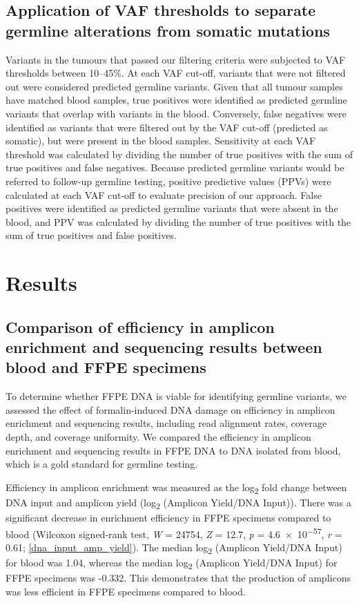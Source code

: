 \documentclass{bmcart}
\begin{document}
\subsection*{Application of VAF thresholds to separate germline alterations from somatic mutations}

Variants in the tumours that passed our filtering criteria were subjected to VAF thresholds between 10--45\%. At each VAF cut-off, variants that were not filtered out were considered predicted germline variants. Given that all tumour samples have matched blood samples, true positives were identified as predicted germline variants that overlap with variants in the blood. Conversely, false negatives were identified as variants that were filtered out by the VAF cut-off (predicted as somatic), but were present in the blood samples. Sensitivity at each VAF threshold was calculated by dividing the number of true positives with the sum of true positives and false negatives. Because predicted germline variants would be referred to follow-up germline testing, positive predictive values (PPVs) were calculated at each VAF cut-off to evaluate precision of our approach. False positives were identified as predicted germline variants that were absent in the blood, and PPV was calculated by dividing the number of true positives with the sum of true positives and false positives.

\section*{Results}

\subsection*{Comparison of efficiency in amplicon enrichment and sequencing results between blood and FFPE specimens}

To determine whether FFPE DNA is viable for identifying germline variants, we assessed the effect of formalin-induced DNA damage on efficiency in amplicon enrichment and sequencing results, including read alignment rates, coverage depth, and coverage uniformity. We compared the efficiency in amplicon enrichment and sequencing results in FFPE DNA to DNA isolated from blood, which is a gold standard for germline testing.

Efficiency in amplicon enrichment was measured as the log\textsubscript{2} fold change between DNA input and amplicon yield (log\textsubscript{2} (Amplicon Yield/DNA Input)). There was a significant decrease in enrichment efficiency in FFPE specimens compared to blood (Wilcoxon signed-rank test, \textit{W} = 24754, \textit{Z} = 12.7, \textit{p} = \num{4.6e-57}, \textit{r} = 0.61; \autoref{dna_input_amp_yield}). The median log\textsubscript{2} (Amplicon Yield/DNA Input) for blood was 1.04, whereas the median log\textsubscript{2} (Amplicon Yield/DNA Input) for FFPE specimens was -0.332. This demonstrates that the production of amplicons was less efficient in FFPE specimens compared to blood.
\end{document}
